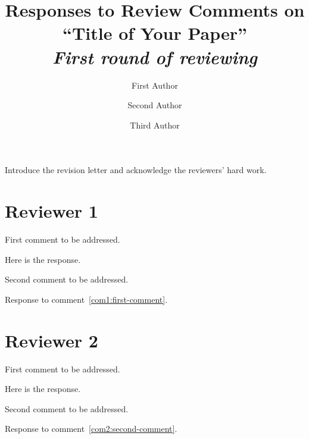 \documentclass[a4paper]{article}
\begin{document}
\title{Responses to Review Comments on ``Title of Your Paper'' \\
  \vspace{0.5em} \large \emph{First round of reviewing}}
\author{First Author \and Second Author \and Third Author}

\maketitle

\setlength\parindent{0pt}

\noindent Introduce the revision letter and acknowledge the reviewers'
hard work.

\section{Reviewer 1}\label{sec:reviewer1}

\begin{revcom}
  First comment to be addressed.
\end{revcom}

\begin{response}
  Here is the response.
\end{response}

\begin{revcom}
  Second comment to be addressed.
\end{revcom}

\begin{response}
  Response to comment~\ref{com1:first-comment}.
\end{response}

\section{Reviewer 2}\label{sec:reviewer2}

\begin{revcom}
  First comment to be addressed.
\end{revcom}

\begin{response}
  Here is the response.
\end{response}

\begin{revcom}
  Second comment to be addressed.
\end{revcom}

\begin{response}
  Response to comment~\ref{com2:second-comment}.
\end{response}



\end{document}
